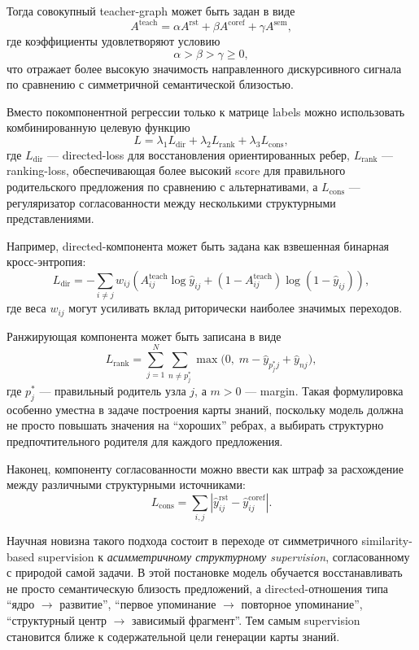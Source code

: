 Тогда совокупный teacher-graph может быть задан в виде
\[
A^{\mathrm{teach}} = \alpha A^{\mathrm{rst}} + \beta A^{\mathrm{coref}} + \gamma A^{\mathrm{sem}},
\]
где коэффициенты удовлетворяют условию
\[
\alpha > \beta > \gamma \ge 0,
\]
что отражает более высокую значимость направленного дискурсивного сигнала по сравнению с симметричной семантической близостью.

Вместо покомпонентной регрессии только к матрице labels можно использовать комбинированную целевую функцию
\[
L = \lambda_1 L_{\mathrm{dir}} + \lambda_2 L_{\mathrm{rank}} + \lambda_3 L_{\mathrm{cons}},
\]
где $L_{\mathrm{dir}}$ --- directed-loss для восстановления ориентированных ребер, $L_{\mathrm{rank}}$ --- ranking-loss, обеспечивающая более высокий score для правильного родительского предложения по сравнению с альтернативами, а $L_{\mathrm{cons}}$ --- регуляризатор согласованности между несколькими структурными представлениями.

Например, directed-компонента может быть задана как взвешенная бинарная кросс-энтропия:
\[
L_{\mathrm{dir}}
=
-\sum_{i \ne j}
w_{ij}
\left(
A^{\mathrm{teach}}_{ij}\log \hat{y}_{ij}
+
(1-A^{\mathrm{teach}}_{ij})\log(1-\hat{y}_{ij})
\right),
\]
где веса $w_{ij}$ могут усиливать вклад риторически наиболее значимых переходов.

Ранжирующая компонента может быть записана в виде
\[
L_{\mathrm{rank}}
=
\sum_{j=1}^{N}
\sum_{n \ne p_j^\ast}
\max\bigl(0,\; m - \hat{y}_{p_j^\ast j} + \hat{y}_{nj}\bigr),
\]
где $p_j^\ast$ --- правильный родитель узла $j$, а $m>0$ --- margin. Такая формулировка особенно уместна в задаче построения карты знаний, поскольку модель должна не просто повышать значения на ``хороших'' ребрах, а выбирать структурно предпочтительного родителя для каждого предложения.

Наконец, компоненту согласованности можно ввести как штраф за расхождение между различными структурными источниками:
\[
L_{\mathrm{cons}}
=
\sum_{i,j}
\left|
\hat{y}^{\mathrm{rst}}_{ij} - \hat{y}^{\mathrm{coref}}_{ij}
\right|.
\]

Научная новизна такого подхода состоит в переходе от симметричного similarity-based supervision к \emph{асимметричному структурному supervision}, согласованному с природой самой задачи. В этой постановке модель обучается восстанавливать не просто семантическую близость предложений, а directed-отношения типа ``ядро $\rightarrow$ развитие'', ``первое упоминание $\rightarrow$ повторное упоминание'', ``структурный центр $\rightarrow$ зависимый фрагмент''. Тем самым supervision становится ближе к содержательной цели генерации карты знаний.

